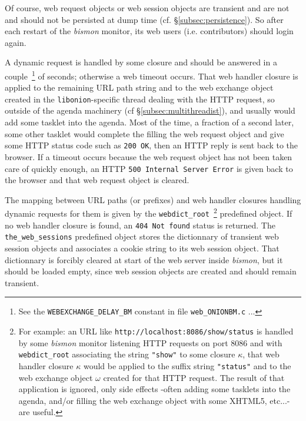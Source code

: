 Of course, web request objects or web session objects are
 transient and are not and should not be persisted at
dump  time (cf. §\ref{subsec:persistence}). So after each
restart of the \emph{bismon} monitor, its web users
(i.e. contributors) should login  again.

A dynamic request is handled by some closure  and
should be answered in a couple~\footnote{See the
  \texttt{WEBEXCHANGE\_DELAY\_BM} constant in file
  \texttt{web\_ONIONBM.c} ...} of seconds; otherwise a  web timeout  occurs. That web handler
 closure is applied to the remaining URL path
string and to the web exchange object created in the
\texttt{libonion}-specific thread dealing with the HTTP request, so
outside of the agenda machinery (cf §\ref{subsec:multithreadist}), and
usually would add some  tasklet into the 
agenda. Most of the time, a fraction of a second later, some other
tasklet would complete the filling the web request object and give
some HTTP status code such as \texttt{200 OK}, then an HTTP reply is
sent back to the browser. If a timeout occurs because the web request
object has not been taken care of quickly enough, an HTTP \texttt{500
  Internal Server Error} is given back to the browser and that web
request object is cleared.

The mapping between URL paths (or prefixes) and web handler closures
handling dynamic requests for them is given by the
\texttt{webdict\_root}~\footnote{For example: an URL like
  \texttt{http://localhost:8086/show/status} is handled by some
  \emph{bismon} monitor listening HTTP requests on port 8086 and with
  \texttt{webdict\_root} associating the string \texttt{"show"} to
  some closure $\kappa$, that web handler closure $\kappa$ would be
  applied to the suffix string \texttt{"status"} and to the web
  exchange object $\omega$ created for that HTTP request. The result
  of that application is ignored, only side effects -often adding some
  tasklets into the agenda, and/or filling the web exchange object
  with some XHTML5, etc...- are useful.}  predefined object. If no web
handler closure is found, an \texttt{404 Not found} status is
returned. The \texttt{the\_web\_sessions} predefined object stores the
dictionnary of transient web session objects and associates a cookie
string to its web session object. That dictionnary is forcibly cleared
at start of the web server inside \emph{bismon}, but it should be
loaded empty, since web session objects are created and should remain
transient.

